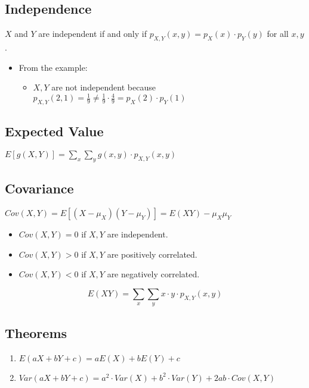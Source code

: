 \documentclass[12pt]{article}
\begin{document}
        \subsection{Independence}
            $X$ and $Y$ are independent if and only if $p_{X, Y}(x, y) = p_X(x) \cdot p_Y(y)$ for all $x, y$.
            \begin{itemize}
                \item From the example:
                \begin{itemize}
                    \item $X, Y$ are not independent because $p_{X, Y}(2, 1) = \frac{1}{9} \neq \frac{1}{9} \cdot \frac{4}{9} = p_X(2) \cdot p_Y(1)$
                \end{itemize}
            \end{itemize}
        \subsection{Expected Value}
            $E[g(X, Y)] = \sum_{x} \sum_{y} g(x, y) \cdot p_{X, Y}(x, y)$
        \subsection{Covariance}
            $Cov(X, Y) = E[(X - \mu_X)(Y - \mu_Y)] = E(XY) - \mu_X \mu_Y$
            \begin{itemize}
                \item $Cov(X, Y) = 0$ if $X, Y$ are independent.
                \item $Cov(X, Y) > 0$ if $X, Y$ are positively correlated.
                \item $Cov(X, Y) < 0$ if $X, Y$ are negatively correlated.
            \end{itemize}
            \begin{equation}
                E(XY) = \sum_{x} \sum_{y} x \cdot y \cdot p_{X, Y}(x, y)
            \end{equation}
        \subsection{Theorems}
            \begin{enumerate}
                \item $E(aX + bY + c) = aE(X) + bE(Y) + c$
                \item $Var(aX + bY + c) = a^2 \cdot Var(X) + b^2 \cdot Var(Y) + 2ab \cdot Cov(X, Y)$
            \end{enumerate}
\end{document}
